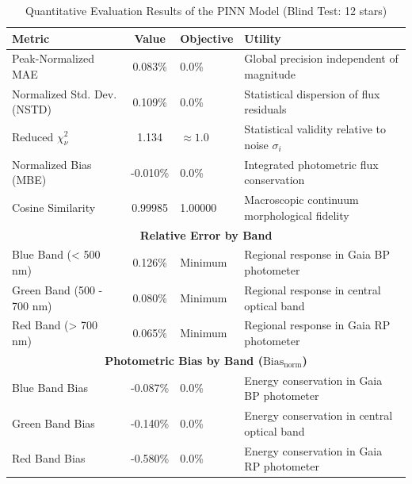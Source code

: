 
\begin{table}[htpb]
\centering
\caption{Quantitative Evaluation Results of the PINN Model (Blind Test: 12 stars)}
\label{tab:pinn_evaluation}
\begin{tabular}{lcll}
\hline
\textbf{Metric} & \textbf{Value} & \textbf{Objective} & \textbf{Utility} \\
\hline
Peak-Normalized MAE & 0.083\% & 0.0\% & Global precision independent of magnitude \\
Normalized Std. Dev. (NSTD) & 0.109\% & 0.0\% & Statistical dispersion of flux residuals \\
Reduced $\chi^2_\nu$ & 1.134 & $\approx 1.0$ & Statistical validity relative to noise $\sigma_i$ \\
Normalized Bias (MBE) & -0.010\% & 0.0\% & Integrated photometric flux conservation \\
Cosine Similarity & 0.99985 & 1.00000 & Macroscopic continuum morphological fidelity \\
\hline
\multicolumn{4}{c}{\textbf{Relative Error by Band}} \\
\hline
Blue Band (< 500 nm) & 0.126\% & Minimum & Regional response in Gaia BP photometer \\
Green Band (500 - 700 nm) & 0.080\% & Minimum & Regional response in central optical band \\
Red Band (> 700 nm) & 0.065\% & Minimum & Regional response in Gaia RP photometer \\
\hline
\multicolumn{4}{c}{\textbf{Photometric Bias by Band ($\text{Bias}_{\text{norm}}$)}} \\
\hline
Blue Band Bias & -0.087\% & 0.0\% & Energy conservation in Gaia BP photometer \\
Green Band Bias & -0.140\% & 0.0\% & Energy conservation in central optical band \\
Red Band Bias & -0.580\% & 0.0\% & Energy conservation in Gaia RP photometer \\
\hline
\end{tabular}
\end{table}
